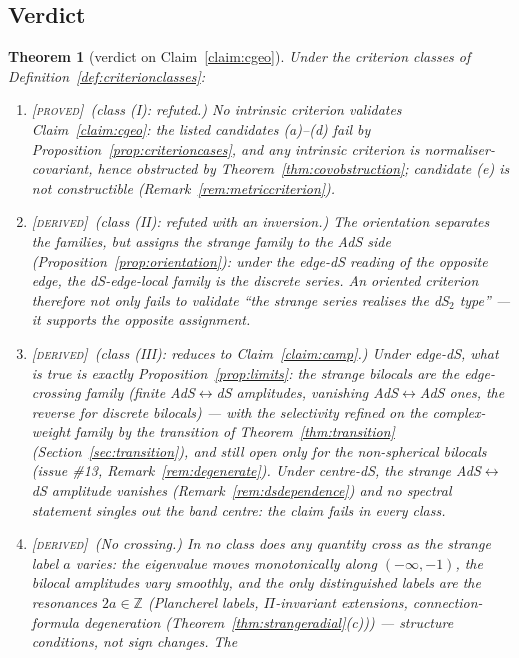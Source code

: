 \documentclass[11pt,a4paper]{article}
\newcommand{\PROVED}{{\color{ForestGreen}\textsc{[proved]}}}
\newcommand{\DERIVED}{{\color{teal}\textsc{[derived]}}}
\theoremstyle{definition}
\theoremstyle{plain}
\newtheorem{theorem}[definition]{Theorem}
\newcommand{\Z}{\mathbb{Z}}
\begin{document}
\subsection{Verdict}

\begin{theorem}[verdict on Claim~\ref{claim:cgeo}]\label{thm:verdict}
Under the criterion classes of Definition~\ref{def:criterionclasses}:
\begin{enumerate}[label=(\roman*)]
\item \PROVED\ \emph{(class (I): refuted.)} No intrinsic criterion validates
Claim~\ref{claim:cgeo}: the listed candidates (a)--(d) fail by
Proposition~\ref{prop:criterioncases}, and \emph{any} intrinsic criterion is
normaliser-covariant, hence obstructed by Theorem~\ref{thm:covobstruction}; candidate (e)
is not constructible (Remark~\ref{rem:metriccriterion}).
\item \DERIVED\ \emph{(class (II): refuted with an inversion.)} The orientation separates
the families, but assigns the strange family to the \emph{AdS} side
(Proposition~\ref{prop:orientation}): under the edge-dS reading of the opposite edge, the
dS-edge-local family is the \emph{discrete} series. An oriented criterion therefore not
only fails to validate ``the strange series realises the dS$_{2}$ type'' --- it supports
the opposite assignment.
\item \DERIVED\ \emph{(class (III): reduces to Claim~\ref{claim:camp}.)} Under edge-dS,
what is true is exactly Proposition~\ref{prop:limits}: the strange bilocals are the
edge-crossing family (finite AdS$\leftrightarrow$dS amplitudes, vanishing
AdS$\leftrightarrow$AdS ones, the reverse for discrete bilocals) --- with the selectivity
refined on the complex-weight family by the transition of Theorem~\ref{thm:transition}
(Section~\ref{sec:transition}), and still open only for the non-spherical bilocals
(issue \#13, Remark~\ref{rem:degenerate}).
Under centre-dS, the strange AdS$\leftrightarrow$dS amplitude vanishes
(Remark~\ref{rem:dsdependence}) and no spectral statement singles out the band centre: the
claim fails in every class.
\item \DERIVED\ \emph{(No crossing.)} In no class does any quantity \emph{cross} as the strange label
$a$ varies: the eigenvalue moves monotonically along $(-\infty,-1)$, the bilocal amplitudes
vary smoothly, and the only distinguished labels are the resonances $2a\in\Z$ (Plancherel
labels, $\Pi$-invariant extensions, connection-formula degeneration
(Theorem~\ref{thm:strangeradial}(c))) --- structure conditions, not sign changes. The

\end{enumerate}
\end{theorem}
\end{document}
